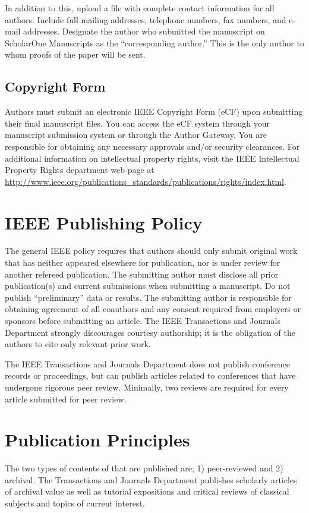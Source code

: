 \documentclass[journal,twoside,web]{ieeecolor}
\begin{document}
In addition to this, upload a file with complete contact information for all 
authors. Include full mailing addresses, telephone numbers, fax numbers, and 
e-mail addresses. Designate the author who submitted the manuscript on 
ScholarOne Manuscripts as the ``corresponding author.'' This is the only 
author to whom proofs of the paper will be sent. 

\subsection{Copyright Form}
Authors must submit an electronic IEEE Copyright Form (eCF) upon submitting 
their final manuscript files. You can access the eCF system through your 
manuscript submission system or through the Author Gateway. You are 
responsible for obtaining any necessary approvals and/or security 
clearances. For additional information on intellectual property rights, 
visit the IEEE Intellectual Property Rights department web page at 
\underline{http://www.ieee.org/publications\_standards/publications/rights/}\discretionary{}{}{}\underline{index.html}. 

\section{IEEE Publishing Policy}
The general IEEE policy requires that authors should only submit original 
work that has neither appeared elsewhere for publication, nor is under 
review for another refereed publication. The submitting author must disclose 
all prior publication(s) and current submissions when submitting a 
manuscript. Do not publish ``preliminary'' data or results. The submitting 
author is responsible for obtaining agreement of all coauthors and any 
consent required from employers or sponsors before submitting an article. 
The IEEE Transactions and Journals Department strongly discourages courtesy 
authorship; it is the obligation of the authors to cite only relevant prior 
work.

The IEEE Transactions and Journals Department does not publish conference 
records or proceedings, but can publish articles related to conferences that 
have undergone rigorous peer review. Minimally, two reviews are required for 
every article submitted for peer review.

\section{Publication Principles}
The two types of contents of that are published are; 1) peer-reviewed and 2) 
archival. The Transactions and Journals Department publishes scholarly 
articles of archival value as well as tutorial expositions and critical 
reviews of classical subjects and topics of current interest. 
\end{document}

